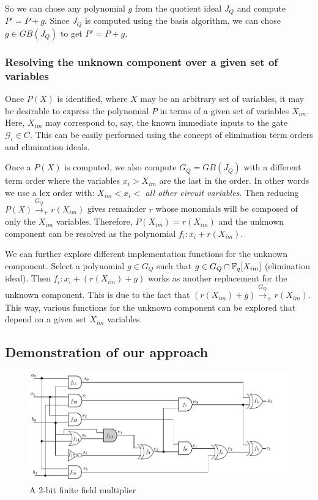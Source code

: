 So we can chose any polynomial $g$ from the quotient
ideal $J_Q$ and compute $P' = P + g$. Since $J_Q$ is computed using
the \Grobner basis algorithm, we can chose $g \in GB(J_Q)$ to get $P'
= P + g$.


\subsubsection{Resolving the unknown component over a given set of
  variables} Once $P(X)$ is identified, where $X$ may be an
arbitrary set of variables, it may be desirable to express the
polynomial $P$ in terms of a given set of variables $X_{im}$. Here,
$X_{im}$ may correspond to, say, the known immediate inputs to the
gate $\mathcal{G}_i \in C$. This can be easily performed using the
concept of elimination term orders and elimination ideals.

Once a $P(X)$ is computed, we also compute $G_Q = GB(J_Q)$ with a
different term order where the variables $x_i > X_{im}$ are the last
in the order. In other words we use a lex order with: $X_{im} < x_i <
$ {\it all other circuit variables}. Then reducing
$P(X) \xrightarrow{G_Q}_+ r(X_{im})$ gives remainder $r$ whose
monomials will be composed of only the $X_{im}$ variables. Therefore,
$P(X_{im}) = r(X_{im})$ and the unknown component can be resolved as
the polynomial $f_i: x_i + r(X_{im})$.

We can further explore different implementation functions for the
unknown component. Select a polynomial $g \in G_Q$ such that $g \in
G_Q \cap {\mathbb{F}}_{q}[X_{im}]$ (elimination ideal). Then $f_i: x_i + (r(X_{im})
+ g)$ works as another replacement for the unknown component. This is
due to the fact that $(r(X_{im}) + g)
\xrightarrow{G_Q}_+r(X_{im})$. This way,  various functions for the
unknown component can be explored that depend on a given set $X_{im}$
variables. 


\subsection{Demonstration of our approach}

\begin{figure}[hbt]
	\begin{center}
	\includegraphics[scale = 0.65]{mas_c}
	\end{center}
	\vspace{-2ex}
	\caption{A 2-bit finite field multiplier}
	\label{mas_c}
	\vspace{-1ex}
\end{figure}

